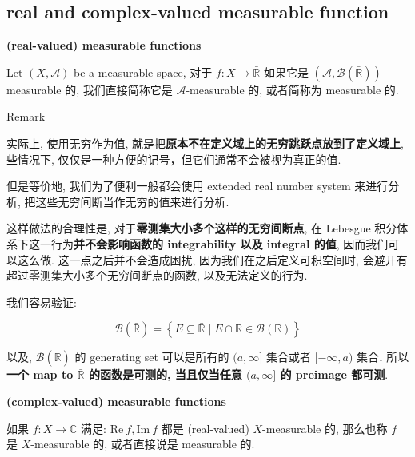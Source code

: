 \documentclass{qlnotes-export}
\begin{document}
\subsection{real and complex-valued measurable function}\label{real-and-complex-valued-measurable-function}

\begin{definition}{\protect{}\label{kn-real-valued-measurable-functions}{\textbf{(real-valued)
measurable functions}}}

Let \((X,\mathcal{A})\) be a measurable space, 对于 \(f:X\rightarrow\bar{\mathbb{R}}\) 如果它是 \((\mathcal{A},\mathcal{B}(\bar{\mathbb{R}}))\)-measurable 的, 我们直接简称它是 \(\mathcal{A}\)-measurable 的, 或者简称为 measurable 的.

\end{definition}

\begin{qlremark}{Remark}

实际上, 使用无穷作为值, 就是把\textbf{原本不在定义域上的无穷跳跃点放到了定义域上}, 些情况下, 仅仅是一种方便的记号，但它们通常不会被视为真正的值.

但是等价地, 我们为了便利一般都会使用 extended real number system 来进行分析, 把这些无穷间断当作无穷的值来进行分析.

这样做法的合理性是, 对于\textbf{零测集大小多个这样的无穷间断点}, 在 Lebesgue 积分体系下这一行为\textbf{并不会影响函数的 integrability 以及 integral 的值}, 因而我们可以这么做. 这一点之后并不会造成困扰, 因为我们在之后定义可积空间时, 会避开有超过零测集大小多个无穷间断点的函数, 以及无法定义的行为.

我们容易验证:

\[\mathcal{B}(\bar{\mathbb{R}}) = \left\{ {E \subseteq \bar{\mathbb{R}} \mid E \cap {\mathbb{R}} \in \mathcal{B}({\mathbb{R}})} \right\}\]

以及, \(\mathcal{B}(\bar{\mathbb{R}})\) 的 generating set 可以是所有的 \((a,\infty\rbrack\) 集合或者 \(\lbrack - \infty,a)\) 集合\textbf{.} 所以\textbf{一个 map to \(\bar{\mathbb{R}}\) 的函数是可测的, 当且仅当任意 \((a,\infty\rbrack\) 的 preimage 都可测}.\\

\end{qlremark}

\begin{definition}{\protect{}\label{kn-complex-valued-measurable-functions}{\textbf{(complex-valued)
measurable functions}}}

如果 \(f:X\rightarrow{\mathbb{C}}\) 满足: \(\text{Re}\ f,\text{Im}\ f\) 都是 (real-valued) \(X\)-measurable 的, 那么也称 \(f\) 是 \(X\)-measurable 的, 或者直接说是 measurable 的.

\end{definition}
\end{document}
